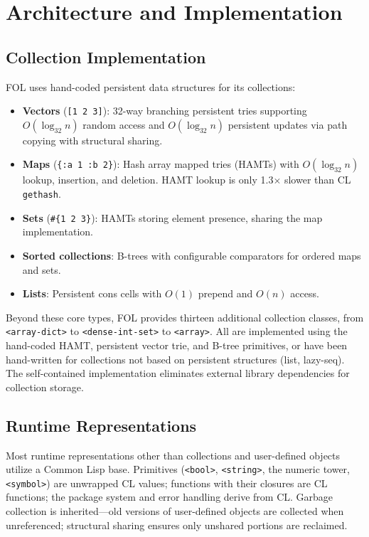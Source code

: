 \documentclass[sigconf,nonacm,review]{acmart}
\begin{document}
\section{Architecture and Implementation}

\subsection{Collection Implementation}

FOL uses hand-coded persistent data structures for its collections:

\begin{itemize}
\item \textbf{Vectors} (\texttt{[1 2 3]}): 32-way branching persistent tries supporting $O(\log_{32} n)$ random access and $O(\log_{32} n)$ persistent updates via path copying with structural sharing.
\item \textbf{Maps} (\texttt{\{:a 1 :b 2\}}): Hash array mapped tries (HAMTs) with $O(\log_{32} n)$ lookup, insertion, and deletion. HAMT lookup is only 1.3$\times$ slower than CL \texttt{gethash}.
\item \textbf{Sets} (\texttt{\#\{1 2 3\}}): HAMTs storing element presence, sharing the map implementation.
\item \textbf{Sorted collections}: B-trees with configurable comparators for ordered maps and sets.
\item \textbf{Lists}: Persistent cons cells with $O(1)$ prepend and $O(n)$ access.
\end{itemize}

Beyond these core types, FOL provides thirteen additional collection classes, from \texttt{<array-dict>} to \texttt{<dense-int-set>} to \texttt{<array>}. All are implemented using the hand-coded HAMT, persistent vector trie, and B-tree primitives, or have been hand-written for collections not based on persistent structures (list, lazy-seq). The self-contained implementation eliminates external library dependencies for collection storage.

\subsection{Runtime Representations}

Most runtime representations other than collections and user-defined objects utilize a Common Lisp base. Primitives (\texttt{<bool>}, \texttt{<string>}, the numeric tower, \texttt{<symbol>}) are unwrapped CL values; functions with their closures are CL functions; the package system and error handling derive from CL. Garbage collection is inherited---old versions of user-defined objects are collected when unreferenced; structural sharing ensures only unshared portions are reclaimed.
\end{document}
